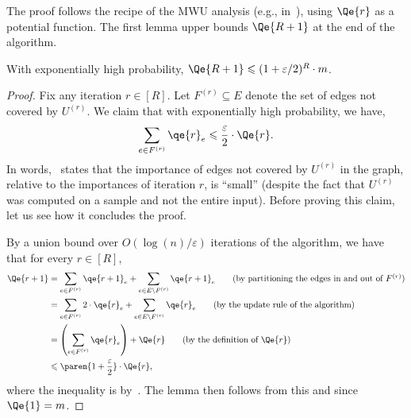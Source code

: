 \documentclass{theoretics}
\renewcommand{\leq}{\leqslant}
\DeclarePairedDelimiter{\paren}()
\newcommand{\eps}{\varepsilon}
\begin{document}
The proof follows the recipe of the MWU analysis (e.g., in~\cite{AroraHK12}), using $\Qe{r}$ as a potential function. The first lemma upper bounds $\Qe{R+1}$ at the end of the algorithm. 
\begin{lemma}\label{lem:Qr-small-bipartite}
	With exponentially high probability, $\Qe{R+1} \leq (1+\eps/2)^{R} \cdot m$.  
\end{lemma}
\begin{proof}
	Fix any iteration $r \in [R]$. Let $F^{(r)} \subseteq E$ denote the set of edges {not} covered by $U^{(r)}$. We claim that with exponentially high probability, we have,
	\begin{align}
		\sum_{e \in F^{(r)}} \qe{r}_e \leq \frac{\eps}{2} \cdot \Qe{r}. \label{eq:clm1-bipartite}
	\end{align}
	In words,~ states that the importance of edges {not} covered by $U^{(r)}$ in the graph, relative to the importances of iteration $r$, is ``small'' (despite the fact that $U^{(r)}$ was computed
	on a sample and not the entire input). Before proving this claim, let us see how it concludes the proof. 
	
	By a union bound over $O(\log{(n)}/\eps)$ iterations of the algorithm, we have that for every $r \in [R]$, 
	\begin{align*}
		\Qe{r+1} &= \sum_{e \in F^{(r)}} \qe{r+1}_e + \sum_{e \in E \setminus F^{(r)}} \qe{r+1}_e \tag{by partitioning the edges in and out of $F^{(r)}$} \\
		&= \sum_{e \in F^{(r)}} 2 \cdot \qe{r}_e + \sum_{e \in E \setminus F^{(r)}} \qe{r}_e \tag{by the update rule of the algorithm} \\
		&= \left(\sum_{e \in F^{(r)}} \qe{r}_e\right) + \Qe{r} \tag{by the definition of $\Qe{r}$} \\
		&\leq \paren{1+\frac{\eps}{2}} \cdot \Qe{r},
	\end{align*}
	where the inequality is by~. The lemma then follows from this and since $\Qe{1} = m$. 
	

\end{proof}
\end{document}
